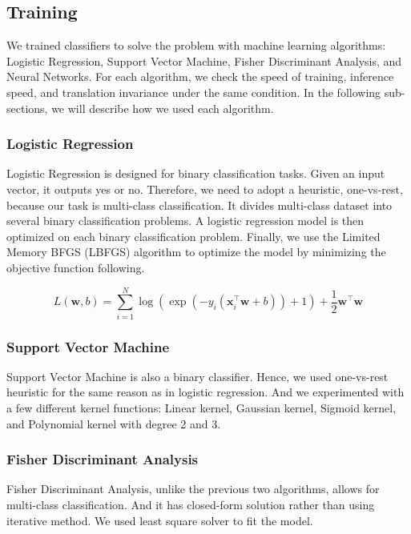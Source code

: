 \documentclass[main.tex]{subfiles}
\begin{document}
\subsection{Training}

We trained classifiers to solve the problem with machine learning algorithms: Logistic Regression, Support Vector Machine, Fisher Discriminant Analysis, and Neural Networks.
For each algorithm, we check the speed of training, inference speed, and translation invariance under the same condition.
In the following sub-sections, we will describe how we used each algorithm.

\subsubsection{Logistic Regression}
Logistic Regression is designed for binary classification tasks. Given an input vector, it outputs yes or no.
Therefore, we need to adopt a heuristic, one-vs-rest, because our task is multi-class classification.
It divides multi-class dataset into several binary classification problems.
A logistic regression model is then optimized on each binary classification problem.
Finally, we use the Limited Memory BFGS (LBFGS) algorithm to optimize the model by minimizing the objective function following.

\begin{equation}
	L(\mathbf{w}, b) = \sum_{i=1}^{N} \log \left(\exp\left(-y_{i} \left(\mathbf{x}_i^{\top}\mathbf{w} + b\right)\right) + 1\right) + \frac{1}{2} \mathbf{w}^{\top}\mathbf{w}
\end{equation}


\subsubsection{Support Vector Machine}
Support Vector Machine is also a binary classifier.
Hence, we used one-vs-rest heuristic for the same reason as in logistic regression.
And we experimented with a few different kernel functions: Linear kernel, Gaussian kernel, Sigmoid kernel, and Polynomial kernel with degree 2 and 3.


\subsubsection{Fisher Discriminant Analysis}
Fisher Discriminant Analysis, unlike the previous two algorithms, allows for multi-class classification.
And it has closed-form solution rather than using iterative method.
We used least square solver to fit the model.
\end{document}
